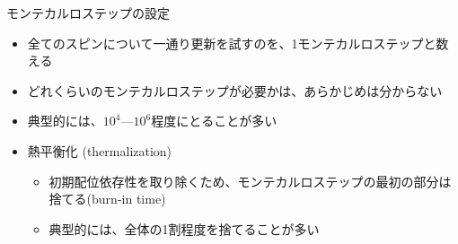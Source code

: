\begin{frame}[t,fragile]{モンテカルロステップの設定}
  \begin{itemize}
  \item 全てのスピンについて一通り更新を試すのを、1モンテカルロステップと数える
  \item どれくらいのモンテカルロステップが必要かは、あらかじめは分からない
  \item 典型的には、$10^4$---$10^6$程度にとることが多い
  \item 熱平衡化 (thermalization)
    \begin{itemize}
    \item 初期配位依存性を取り除くため、モンテカルロステップの最初の部分は捨てる(burn-in time)
    \item 典型的には、全体の1割程度を捨てることが多い
    \end{itemize}
  \end{itemize}
\end{frame}
